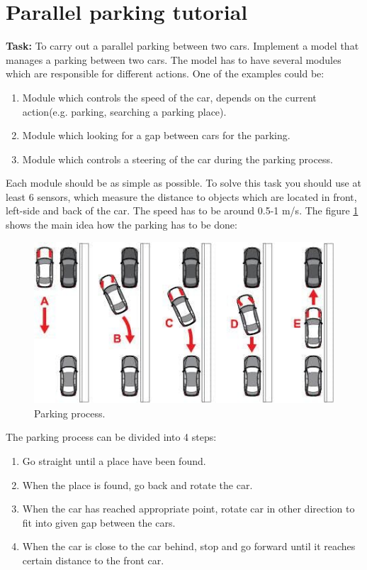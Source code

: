 \section{Parallel parking tutorial}
\textbf{Task:} To carry out a parallel parking between two cars. \newline
Implement a model that manages a parking between two cars. The model has to have several modules which are responsible for different actions. One of the examples could be:
\begin{enumerate}
    \item Module which controls the speed of the car, depends on the current action(e.g. parking, searching a parking place).
    \item Module which looking for a gap between cars for the parking.
    \item Module which controls a steering of the car during the parking process.
\end{enumerate}
Each module should be as simple as possible. \newline
To solve this task you should use at least 6 sensors, which measure the distance to objects which are located in front, left-side and back of the car. The speed has to be around 0.5-1 m/s. The figure \ref{fig:parking} shows the main idea how the parking has to be done:
\begin{figure}[h!]
    \centering
    \includegraphics[width=0.8\linewidth]{src/pic/parking_process1}
    \caption{Parking process.}
    \label{fig:parking}
\end{figure} \newline
The parking process can be divided into 4 steps:
\begin{enumerate}
    \item Go straight until a place have been found.
    \item When the place is found, go back and rotate the car.
    \item When the car has reached appropriate point, rotate car in other direction to fit into given gap between the cars.
    \item When the car is close to the car behind, stop and go forward until it reaches certain distance to the front car.
\end{enumerate}
